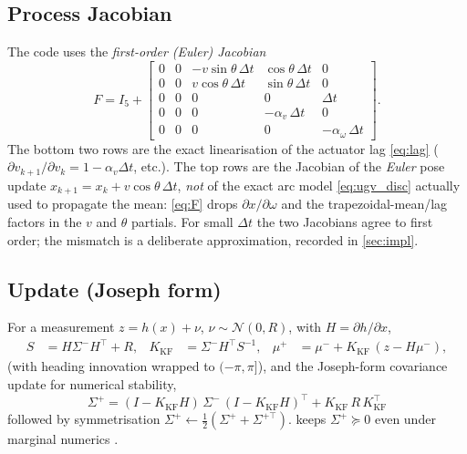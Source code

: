\documentclass[11pt]{article}
\begin{document}
\subsection{Process Jacobian}
The code uses the \emph{first-order (Euler) Jacobian}
\begin{equation}
F = I_5 +
\begin{bmatrix}
0 & 0 & -v\sin\theta\,\Delta t & \cos\theta\,\Delta t & 0\\
0 & 0 &  v\cos\theta\,\Delta t & \sin\theta\,\Delta t & 0\\
0 & 0 & 0 & 0 & \Delta t\\
0 & 0 & 0 & -\alpha_v\,\Delta t & 0\\
0 & 0 & 0 & 0 & -\alpha_\omega\,\Delta t
\end{bmatrix}.
\label{eq:F}
\end{equation}
The bottom two rows are the exact linearisation of the actuator lag \cref{eq:lag} ($\partial v_{k+1}/\partial
v_k=1-\alpha_v\Delta t$, etc.). The top rows are the Jacobian of the \emph{Euler} pose update
$x_{k+1}=x_k+v\cos\theta\,\Delta t$, \emph{not} of the exact arc model \cref{eq:ugv_disc} actually used to
propagate the mean: \cref{eq:F} drops $\partial x/\partial\omega$ and the trapezoidal-mean/lag factors in the
$v$ and $\theta$ partials. For small $\Delta t$ the two Jacobians agree to first order; the mismatch is a
deliberate approximation, recorded in \cref{sec:impl}.

\subsection{Update (Joseph form)}
For a measurement $z=h(x)+\nu$, $\nu\sim\mathcal N(0,R)$, with $H=\partial h/\partial x$,
\begin{align}
S &= H\Sigma^- H^\top + R, & K_{\text{KF}} &= \Sigma^- H^\top S^{-1}, &
\mu^+ &= \mu^- + K_{\text{KF}}\,(z - H\mu^-),
\label{eq:ekfgain}
\end{align}
(with heading innovation wrapped to $(-\pi,\pi]$), and the Joseph-form covariance update for numerical
stability,
\begin{equation}
\boxed{\;\Sigma^+ = (I-K_{\text{KF}}H)\,\Sigma^-\,(I-K_{\text{KF}}H)^\top + K_{\text{KF}}\,R\,K_{\text{KF}}^\top\;}
\label{eq:joseph}
\end{equation}
followed by symmetrisation $\Sigma^+\leftarrow\tfrac12(\Sigma^++\Sigma^{+\top})$.  keeps
$\Sigma^+\succeq0$ even under marginal numerics \citep{thrun2005probabilistic}.
\end{document}
